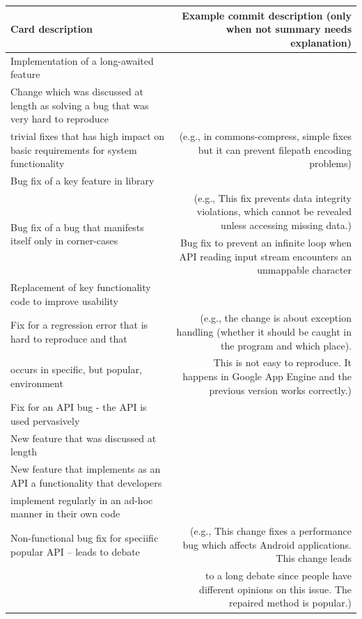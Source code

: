 \begin{landscape}
  
 \begin{table}
 \centering
 \scriptsize
 	\begin{tabular}{l|r}
 	\bf Card description & \bf Example commit description (only when not summary needs explanation) \\
 	\hline
 	\hline
 		Implementation of a long-awaited feature & \\ \hline
 		Change which was discussed at length as solving a bug that was very hard to reproduce &	\\ \hline
 		trivial fixes that has high impact on basic requirements for system functionality & (e.g., in commons-compress, simple fixes but it can prevent filepath encoding problems)	\\ \hline
 		Bug fix of a key feature in library & \\ \hline
 		\multirow{2}{*}{Bug fix of a bug that manifests itself only in corner-cases} & (e.g., This fix prevents data integrity violations, which cannot be revealed unless accessing missing data.)\\
 		& Bug fix to prevent an infinite loop when API reading input stream encounters an unmappable character \\
 		\hline
 		Replacement of key functionality code to improve usability & \\ \hline
 		Fix for a regression error that is hard to reproduce and that & (e.g., the change is about exception handling (whether it should be 	caught in the program and which place). \\ 
 		occurs in specific, but popular, environment  &This is not easy to reproduce. It happens in Google App Engine and the previous version works correctly.) \\ \hline
 		Fix for an API bug - the API is used pervasively	 & \\\hline
		New feature that was discussed at length	 & \\\hline
 		New feature that implements as an API a functionality that developers 		&	\\
 		implement regularly in an ad-hoc manner in their own code & \\ \hline
		Non-functional bug fix for speciific popular API -- leads to debate & (e.g., This change fixes a performance bug which affects Android applications. This change leads \\
&  to a long 	debate	since people have different opinions on this issue. The repaired method is popular.)\\ \hline

\end{tabular}
\end{table}
\end{landscape}
